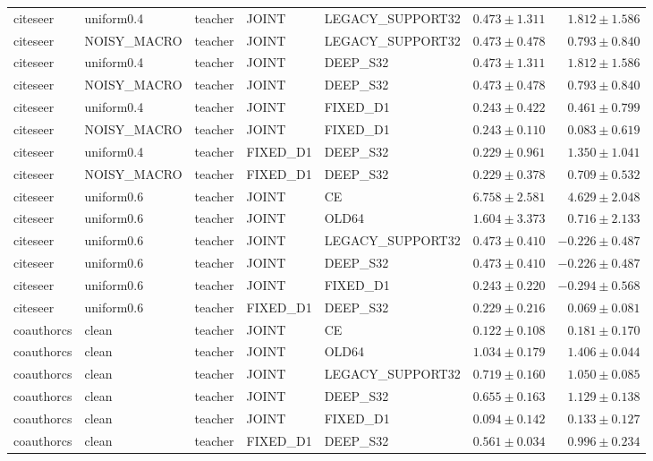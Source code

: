 \begin{longtable}{lllllrr}
citeseer & uniform0.4 & teacher & JOINT & LEGACY\_SUPPORT32 & $0.473 \pm 1.311$ & $1.812 \pm 1.586$ \\
citeseer & NOISY\_MACRO & teacher & JOINT & LEGACY\_SUPPORT32 & $0.473 \pm 0.478$ & $0.793 \pm 0.840$ \\
citeseer & uniform0.4 & teacher & JOINT & DEEP\_S32 & $0.473 \pm 1.311$ & $1.812 \pm 1.586$ \\
citeseer & NOISY\_MACRO & teacher & JOINT & DEEP\_S32 & $0.473 \pm 0.478$ & $0.793 \pm 0.840$ \\
citeseer & uniform0.4 & teacher & JOINT & FIXED\_D1 & $0.243 \pm 0.422$ & $0.461 \pm 0.799$ \\
citeseer & NOISY\_MACRO & teacher & JOINT & FIXED\_D1 & $0.243 \pm 0.110$ & $0.083 \pm 0.619$ \\
citeseer & uniform0.4 & teacher & FIXED\_D1 & DEEP\_S32 & $0.229 \pm 0.961$ & $1.350 \pm 1.041$ \\
citeseer & NOISY\_MACRO & teacher & FIXED\_D1 & DEEP\_S32 & $0.229 \pm 0.378$ & $0.709 \pm 0.532$ \\
citeseer & uniform0.6 & teacher & JOINT & CE & $6.758 \pm 2.581$ & $4.629 \pm 2.048$ \\
citeseer & uniform0.6 & teacher & JOINT & OLD64 & $1.604 \pm 3.373$ & $0.716 \pm 2.133$ \\
citeseer & uniform0.6 & teacher & JOINT & LEGACY\_SUPPORT32 & $0.473 \pm 0.410$ & $-0.226 \pm 0.487$ \\
citeseer & uniform0.6 & teacher & JOINT & DEEP\_S32 & $0.473 \pm 0.410$ & $-0.226 \pm 0.487$ \\
citeseer & uniform0.6 & teacher & JOINT & FIXED\_D1 & $0.243 \pm 0.220$ & $-0.294 \pm 0.568$ \\
citeseer & uniform0.6 & teacher & FIXED\_D1 & DEEP\_S32 & $0.229 \pm 0.216$ & $0.069 \pm 0.081$ \\
coauthorcs & clean & teacher & JOINT & CE & $0.122 \pm 0.108$ & $0.181 \pm 0.170$ \\
coauthorcs & clean & teacher & JOINT & OLD64 & $1.034 \pm 0.179$ & $1.406 \pm 0.044$ \\
coauthorcs & clean & teacher & JOINT & LEGACY\_SUPPORT32 & $0.719 \pm 0.160$ & $1.050 \pm 0.085$ \\
coauthorcs & clean & teacher & JOINT & DEEP\_S32 & $0.655 \pm 0.163$ & $1.129 \pm 0.138$ \\
coauthorcs & clean & teacher & JOINT & FIXED\_D1 & $0.094 \pm 0.142$ & $0.133 \pm 0.127$ \\
coauthorcs & clean & teacher & FIXED\_D1 & DEEP\_S32 & $0.561 \pm 0.034$ & $0.996 \pm 0.234$ \\

\end{longtable}
